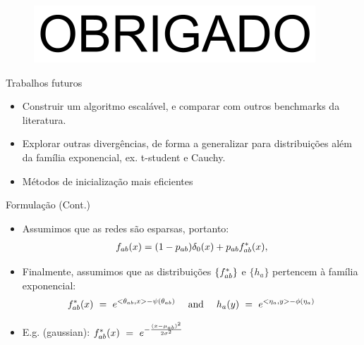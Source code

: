 \documentclass[aspectratio=169]{beamer}
\begin{document}
\begin{frame}
  \begin{figure}
  	\centering
  	\includegraphics[scale=0.5]{img/OBRIGADO.png}
  \end{figure}
\end{frame}









\begin{frame}{Trabalhos futuros}
	\begin{itemize}
		\item Construir um algoritmo escalável, e comparar com outros benchmarks da literatura.
		\item Explorar outras divergências, de forma a generalizar para distribuições além da família exponencial, ex. t-student e Cauchy. 
		\item Métodos de inicialização mais eficientes
	\end{itemize}
\end{frame}

\begin{frame} {Formulação (Cont.)}
    \begin{itemize}
        \item Assumimos que as redes são esparsas, portanto: \begin{align*}
             f_{ab}(x) = (1-p_{ab}) \delta_0(x) + p_{ab} f^*_{ab}(x), 
            \end{align*}
        \item Finalmente, assumimos que as distribuições $\{f^*_{ab} \}$ e $\{h_a\}$ pertencem à família exponencial:
        \begin{align*}
        \label{eq:csbm_exponential_families}
         f^*_{ab}(x) \ = \  e^{ <\theta_{ab}, x> - \psi(\theta_{ab}) } 
         \quad \text{ and } \quad
         h_a(y) \ = \  e^{<\eta_a, y> - \phi(\eta_a)}
        \end{align*}
        \item E.g. (gaussian): $f^* _{ab}(x)  \ = \  e^{-\frac{(x-\mu_{ab})^2}{2\sigma^2}}$
    \end{itemize}
\end{frame}
\end{document}

